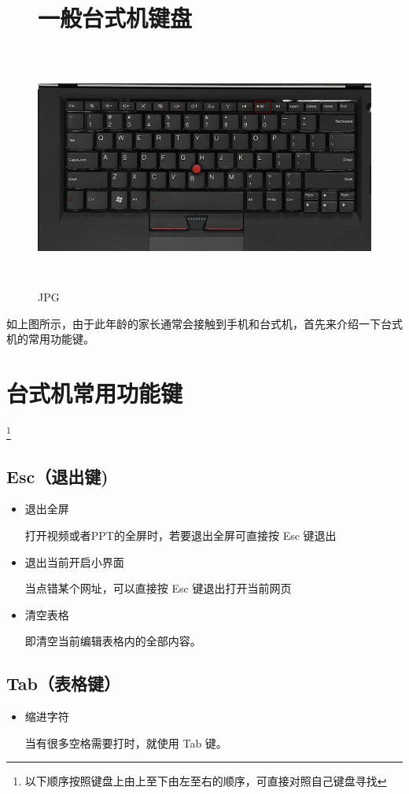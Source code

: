 \documentclass[12pt]{article}
\begin{document}
\begin{figure}
\section{一般台式机键盘}
\centering
\includegraphics[height=8cm,width=15cm]{1.jpg}
\caption{JPG}
\label{1}
\end{figure}
如上图所示，由于此年龄的家长通常会接触到手机和台式机，首先来介绍一下台式机的常用功能键。
\section{台式机常用功能键}
\footnote{以下顺序按照键盘上由上至下由左至右的顺序，可直接对照自己键盘寻找}
\subsection{Esc（退出键)}
\begin{itemize}
	\item 退出全屏
	
打开视频或者PPT的全屏时，若要退出全屏可直接按 Esc 键退出
	\item 退出当前开启小界面
	
当点错某个网址，可以直接按 Esc 键退出打开当前网页
	\item 清空表格
	
即清空当前编辑表格内的全部内容。
\end{itemize}
\subsection{Tab（表格键）}
\begin{itemize}
	\item 缩进字符
	
当有很多空格需要打时，就使用 Tab 键。
\end{itemize}
\end{document}
